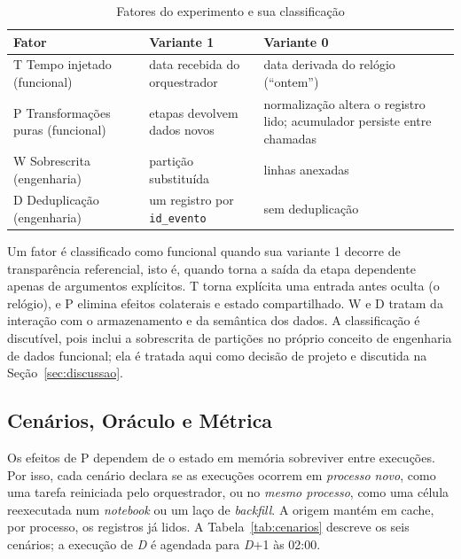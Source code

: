 \begin{table}[t]
  \caption{Fatores do experimento e sua classificação}
  \label{tab:fatores}
  \small
  \begin{tabular}{>{\raggedright\arraybackslash}p{}>{\raggedright\arraybackslash}p{}>{\raggedright\arraybackslash}p{}}
    \toprule
    Fator & Variante 1 & Variante 0 \\
    \midrule
    T Tempo injetado \newline (funcional) & data recebida do orquestrador & data derivada do relógio (``ontem'') \\
    P Transformações puras \newline (funcional) & etapas devolvem dados novos & normalização altera o registro lido; acumulador persiste entre chamadas \\
    W Sobrescrita \newline (engenharia) & partição substituída & linhas anexadas \\
    D Deduplicação \newline (engenharia) & um registro por \texttt{id\_evento} & sem deduplicação \\
    \bottomrule
  \end{tabular}
\end{table}

Um fator é classificado como funcional quando sua variante 1 decorre de transparência referencial, isto é, quando torna a saída da etapa dependente apenas de argumentos explícitos. T torna explícita uma entrada antes oculta (o relógio), e P elimina efeitos colaterais e estado compartilhado. W e D tratam da interação com o armazenamento e da semântica dos dados. A classificação é discutível, pois \citet{beauchemin2018} inclui a sobrescrita de partições no próprio conceito de engenharia de dados funcional; ela é tratada aqui como decisão de projeto e discutida na Seção~\ref{sec:discussao}.

\subsection{Cenários, Oráculo e Métrica}

Os efeitos de P dependem de o estado em memória sobreviver entre execuções. Por isso, cada cenário declara se as execuções ocorrem em \emph{processo novo}, como uma tarefa reiniciada pelo orquestrador, ou no \emph{mesmo processo}, como uma célula reexecutada num \emph{notebook} ou um laço de \emph{backfill}. A origem mantém em cache, por processo, os registros já lidos. A Tabela~\ref{tab:cenarios} descreve os seis cenários; a execução de \emph{D} é agendada para \emph{D}+1 às 02:00.

